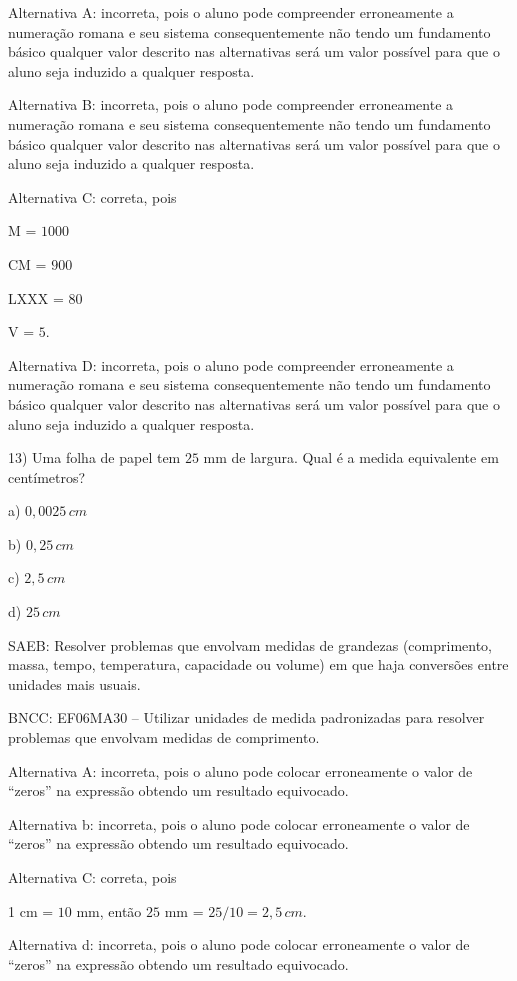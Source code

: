 Alternativa A: incorreta, pois o aluno pode compreender erroneamente a
numeração romana e seu sistema consequentemente não tendo um fundamento
básico qualquer valor descrito nas alternativas será um valor possível
para que o aluno seja induzido a qualquer resposta.

Alternativa B: incorreta, pois o aluno pode compreender erroneamente a
numeração romana e seu sistema consequentemente não tendo um fundamento
básico qualquer valor descrito nas alternativas será um valor possível
para que o aluno seja induzido a qualquer resposta.

Alternativa C: correta, pois

M = $1000$

CM = $900$

LXXX = $80$

V = $5$.

Alternativa D: incorreta, pois o aluno pode compreender erroneamente a
numeração romana e seu sistema consequentemente não tendo um fundamento
básico qualquer valor descrito nas alternativas será um valor possível
para que o aluno seja induzido a qualquer resposta.

13) Uma folha de papel tem $25$ mm de largura. Qual é a medida equivalente
em centímetros?

a) $0,0025\,cm$

b) $0,25\,cm$

c) $2,5\,cm$

d) $25\,cm$

SAEB: Resolver problemas que envolvam medidas de grandezas (comprimento,
massa, tempo, temperatura, capacidade ou volume) em que haja conversões
entre unidades mais usuais.

BNCC: EF06MA30 -- Utilizar unidades de medida padronizadas para resolver
problemas que envolvam medidas de comprimento.

Alternativa A: incorreta, pois o aluno pode colocar erroneamente o valor
de ``zeros'' na expressão obtendo um resultado equivocado.

Alternativa b: incorreta, pois o aluno pode colocar erroneamente o valor
de ``zeros'' na expressão obtendo um resultado equivocado.

Alternativa C: correta, pois

1 cm = $10$ mm, então $25$ mm = $25 / 10 = 2,5\,cm$.

Alternativa d: incorreta, pois o aluno pode colocar erroneamente o valor
de ``zeros'' na expressão obtendo um resultado equivocado.

